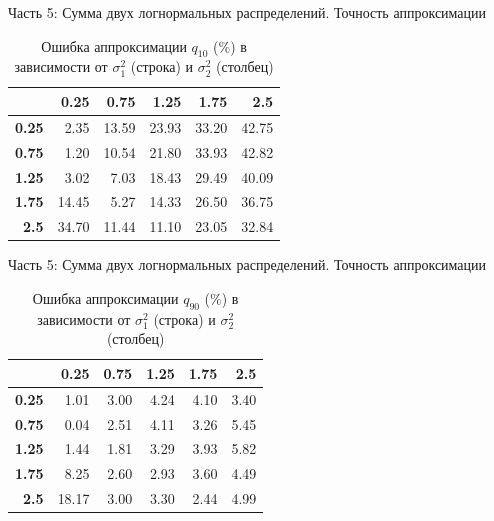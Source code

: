 \documentclass[ucs, notheorems, handout]{beamer}
\begin{document}
\begin{frame}{Часть 5: Сумма двух логнормальных распределений. Точность аппроксимации}
	\begin{table}[ht]
		\centering
		\caption{Ошибка аппроксимации $q_{10}$ ($\%$) в зависимости от $\sigma_{1}^{2}$ (строка) и $\sigma_{2}^{2}$ (столбец)}
		\begin{tabular}{rrrrrr}
			\hline
			& \textbf{0.25} & \textbf{0.75} & \textbf{1.25} & \textbf{1.75} & \textbf{2.5} \\
			\hline
			\textbf{0.25} & 2.35 & 13.59 & 23.93 & 33.20 & 42.75 \\ 
			\textbf{0.75} & 1.20 & 10.54 & 21.80 & 33.93 & 42.82 \\ 
			\textbf{1.25} & 3.02 & 7.03 & 18.43 & 29.49 & 40.09 \\ 
			\textbf{1.75} & 14.45 & 5.27 & 14.33 & 26.50 & 36.75 \\ 
			\textbf{2.5} & 34.70 & 11.44 & 11.10 & 23.05 & 32.84 \\ 
			\hline
		\end{tabular}
	\end{table}
	
\end{frame}

\begin{frame}{Часть 5: Сумма двух логнормальных распределений. Точность аппроксимации}
	
	\begin{table}[ht]
		\centering
		\caption{Ошибка аппроксимации $q_{90}$ ($\%$) в зависимости от $\sigma_{1}^{2}$ (строка) и $\sigma_{2}^{2}$ (столбец) }
		\begin{tabular}{rrrrrr}
			\hline
			& \textbf{0.25} & \textbf{0.75} & \textbf{1.25} & \textbf{1.75} & \textbf{2.5} \\
			\hline
			\textbf{0.25} & 1.01 & 3.00 & 4.24 & 4.10 & 3.40 \\ 
			\textbf{0.75} & 0.04 & 2.51 & 4.11 & 3.26 & 5.45 \\ 
			\textbf{1.25} & 1.44 & 1.81 & 3.29 & 3.93 & 5.82 \\ 
			\textbf{1.75} & 8.25 & 2.60 & 2.93 & 3.60 & 4.49 \\ 
			\textbf{2.5} & 18.17 & 3.00 & 3.30 & 2.44 & 4.99 \\ 
			\hline
		\end{tabular}
	\end{table}
	
\end{frame}
\end{document}
